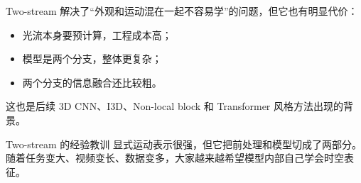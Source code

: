 Two-stream 解决了“外观和运动混在一起不容易学”的问题，但它也有明显代价：

\begin{itemize}
    \item 光流本身要预计算，工程成本高；
    \item 模型是两个分支，整体更复杂；
    \item 两个分支的信息融合还比较粗。
\end{itemize}

这也是后续 3D CNN、I3D、Non-local block 和 Transformer 风格方法出现的背景。

\begin{warningbox}{Two-stream 的经验教训}
显式运动表示很强，但它把前处理和模型切成了两部分。随着任务变大、视频变长、数据变多，大家越来越希望模型内部自己学会时空表征。
\end{warningbox}

